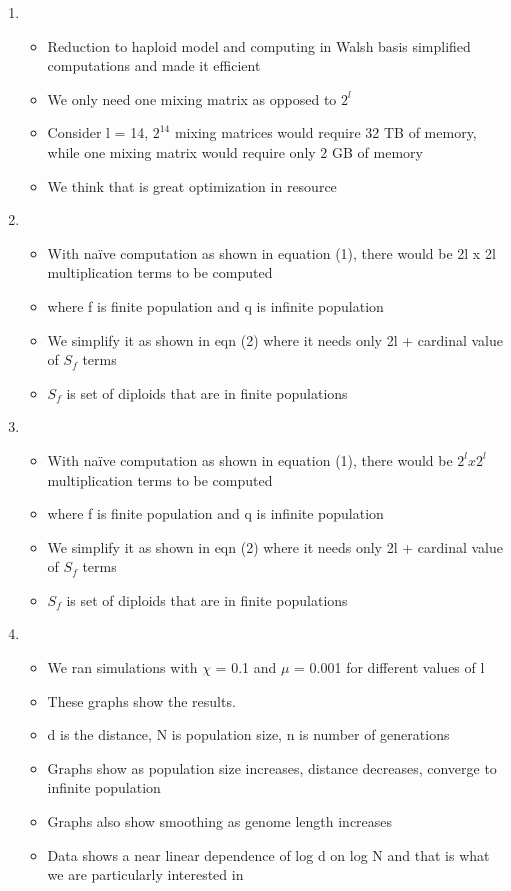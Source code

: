\documentclass{article}
\begin{document}
\begin{enumerate}
\item
  \begin{itemize}
  \item Reduction to haploid model and computing in Walsh basis
    simplified computations and made it efficient
  \item We only need one mixing matrix as opposed to $2^l$
  \item Consider l = 14, $2^14$ mixing matrices would require 32 TB of
    memory, while one mixing matrix would require only 2 GB of memory
  \item We think that is great optimization in resource
  \end{itemize}
    
\item
  \begin{itemize}
  \item With naïve computation as shown in equation (1), there would
    be 2l x 2l multiplication terms to be computed
  \item where f is finite population and q is infinite population
  \item We simplify it as shown in eqn (2) where it needs only 2l +
    cardinal value of $S_f$ terms
  \item $S_f$ is set of diploids that are in finite populations
  \end{itemize}
    
\item
  \begin{itemize}
  \item With naïve computation as shown in equation (1), there would
    be $2^l x 2^l$ multiplication terms to be computed
  \item where f is finite population and q is infinite population
  \item We simplify it as shown in eqn (2) where it needs only 2l +
    cardinal value of $S_f$ terms
  \item $S_f$ is set of diploids that are in finite populations
  \end{itemize}

\item
  \begin{itemize}
  \item We ran simulations with $\chi$ = 0.1 and $\mu$ = 0.001 for
    different values of l
  \item These graphs show the results.
  \item d is the distance, N is population size, n is number of
    generations
  \item Graphs show as population size increases, distance decreases,
    converge to infinite population
  \item Graphs also show smoothing as genome length increases
  \item Data shows a near linear dependence of log d on log N and that
    is what we are particularly interested in
  \end{itemize}
    

\end{enumerate}
\end{document}
